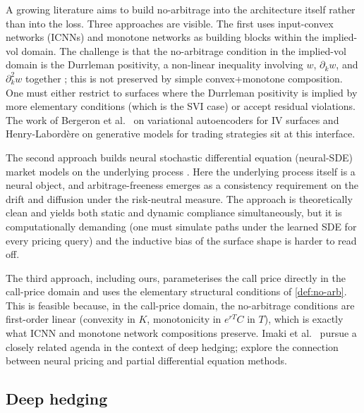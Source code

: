 \documentclass[largeformat]{interact}
\let\cite\citep   %
\theoremstyle{plain}
\theoremstyle{definition}
\begin{document}
A growing literature aims to build no-arbitrage into the architecture itself rather than into the loss. Three approaches are visible. The first uses input-convex networks (ICNNs) \cite{amos2017input} and monotone networks \cite{daniels2010monotone,sill1998monotonic} as building blocks within the implied-vol domain. The challenge is that the no-arbitrage condition in the implied-vol domain is the Durrleman positivity, a non-linear inequality involving $w$, $\partial_k w$, and $\partial^2_k w$ together \cite{gatheral2014arbitrage}; this is not preserved by simple convex+monotone composition. One must either restrict to surfaces where the Durrleman positivity is implied by more elementary conditions (which is the SVI case) or accept residual violations. The work of Bergeron et al.\ \citeyearpar{bergeron2022variational} on variational autoencoders for IV surfaces and Henry-Labord\`ere \citeyearpar{henry2019generative} on generative models for trading strategies sit at this interface.

The second approach builds neural stochastic differential equation (neural-SDE) market models on the underlying process \cite{cohen2023arbitrage,cohen2023nsde,cuchiero2020generative,gambara2021consistent,liu2019pricing}. Here the underlying process itself is a neural object, and arbitrage-freeness emerges as a consistency requirement on the drift and diffusion under the risk-neutral measure. The approach is theoretically clean and yields both static and dynamic compliance simultaneously, but it is computationally demanding (one must simulate paths under the learned SDE for every pricing query) and the inductive bias of the surface shape is harder to read off.

The third approach, including ours, parameterises the call price directly in the call-price domain and uses the elementary structural conditions of \cref{def:no-arb}. This is feasible because, in the call-price domain, the no-arbitrage conditions are first-order linear (convexity in $K$, monotonicity in $e^{rT}C$ in $T$), which is exactly what ICNN and monotone network compositions preserve. Imaki et al.\ \citeyearpar{imaki2021no} pursue a closely related agenda in the context of deep hedging; \cite{ferguson2018deeply} explore the connection between neural pricing and partial differential equation methods.

\subsection{Deep hedging}
\label{sec:related-hedging}
\end{document}
